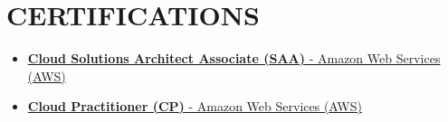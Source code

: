 \documentclass[letterpaper,11pt]{article}
\newcommand{\resumeItem}[1]{
  \item\small{
    {#1 \vspace{-2pt}}
  }
}
\newcommand{\resumeItemListStart}{\begin{itemize}}
\newcommand{\resumeItemListEnd}{\end{itemize}\vspace{-5pt}}
\begin{document}
 \section{CERTIFICATIONS}
    \resumeItemListStart 
        \resumeItem{\href{https://www.credly.com/badges/dc22fd53-b367-4c97-b2ef-066a59371946/public_url}{\textbf{Cloud Solutions Architect Associate (SAA)} - Amazon Web Services (AWS) {\raisebox{-0.1\height}\faExternalLink }}} \vspace{-3pt}
        \resumeItem{\href{https://www.credly.com/badges/d0f572c3-7d2c-416c-803d-4963611704f5/public_url}{\textbf{Cloud Practitioner (CP)} - Amazon Web Services (AWS) {\raisebox{-0.1\height}\faExternalLink }}} \vspace{-3pt}
    \resumeItemListEnd
 \vspace{-5pt}
\end{document}
